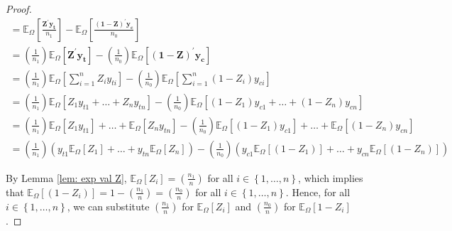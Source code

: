 \documentclass[12pt,leqno]{article}
\theoremstyle{newstyle}
\begin{document}
\begin{proof}
\begin{align*}
= \mathbb{E}_{\Omega} \left[\frac{\mathbf{Z}^{\prime} \mathbf{y_t}}{n_1}\right] - \mathbb{E}_{\Omega}\left[\frac{(\mathbf{1} - \mathbf{Z})^{\prime} \mathbf{y_c}}{n_0}\right] \\
= \left(\frac{1}{n_1} \right) \mathbb{E}_{\Omega} \left[\mathbf{Z}^{\prime} \mathbf{y_t}\right] - \left(\frac{1}{n_0}\right) \mathbb{E}_{\Omega}\left[(\mathbf{1} - \mathbf{Z})^{\prime} \mathbf{y_c}\right] \\
= \left(\frac{1}{n_1} \right) \mathbb{E}_{\Omega} \left[ \sum \limits_{i = 1}^n Z_i y_{ti}\right] - \left(\frac{1}{n_0}\right) \mathbb{E}_{\Omega}\left[\sum \limits_{i = 1}^n \left(1 - Z_i\right) y_{ci} \right] \\
= \left(\frac{1}{n_1} \right) \mathbb{E}_{\Omega} \left[ Z_1 y_{t1} + \dots + Z_n y_{tn}\right] - \left(\frac{1}{n_0}\right) \mathbb{E}_{\Omega}\left[\left(1 - Z_1\right) y_{c1} + \dots + \left(1 - Z_n\right) y_{cn} \right] \\
= \left(\frac{1}{n_1} \right) \mathbb{E}_{\Omega} \left[ Z_1 y_{t1}\right] + \dots + \mathbb{E}_{\Omega} \left[Z_n y_{tn}\right] - \left(\frac{1}{n_0}\right) \mathbb{E}_{\Omega}\left[\left(1 - Z_1\right) y_{c1}\right] + \dots + \mathbb{E}_{\Omega} \left[\left(1 - Z_n\right) y_{cn} \right] \\
= \left(\frac{1}{n_1} \right) \left(y_{t1}\mathbb{E}_{\Omega} \left[ Z_1 \right] + \dots + y_{tn}\mathbb{E}_{\Omega} \left[Z_n\right]\right) - \left(\frac{1}{n_0}\right) \left(y_{c1}\mathbb{E}_{\Omega}\left[\left(1 - Z_1\right) \right] + \dots + y_{cn}\mathbb{E}_{\Omega} \left[\left(1 - Z_n\right) \right]\right)
\end{align*}


By Lemma \ref{lem: exp val Z}, $\mathbb{E}_{\Omega}\left[Z_i \right] = \left(\frac{n_1}{n}\right)$ for all $i \in \left\{1, \dots , n\right\}$, which implies that $\mathbb{E}_{\Omega}\left[\left(1 - Z_i\right) \right] = 1 - \left(\frac{n_1}{n}\right) = \left(\frac{n_0}{n}\right)$ for all $i \in \left\{1, \dots, n\right\}$. Hence, for all $i \in \left\{1, \dots , n\right\}$, we can substitute $\left(\frac{n_1}{n}\right)$ for $\mathbb{E}_{\Omega}\left[Z_i \right]$ and $\left(\frac{n_0}{n}\right)$ for $\mathbb{E}_{\Omega}\left[1 - Z_i \right]$.


\end{proof}
\end{document}
